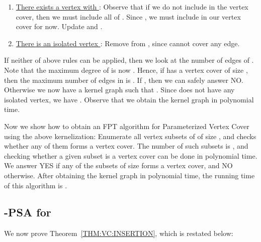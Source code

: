 \documentclass[11pt,letter]{article}
\begin{document}
\begin{enumerate}
 \item \underline{There exists a vertex  with }: Observe that if we do not include  in the vertex cover, then we must include all of . Since , we must include  in our vertex cover for now. Update  and .

\item \underline{There is an isolated vertex }: Remove  from , since
  cannot cover any edge.


\end{enumerate}

If neither of above rules can be applied, then we look at the number of edges of . Note that the maximum degree of  is now . Hence, if  has a vertex cover of size , then the maximum number of edges in  is . If , then we can safely answer NO. Otherwise we now have a kernel graph  such that . Since  does not have any isolated vertex, we have . Observe that we obtain the kernel graph  in polynomial time.


Now we show how to obtain an FPT algorithm for Parameterized Vertex Cover using the above kernelization: Enumerate all vertex subsets of
 of size , and checks whether any of them forms a vertex cover. The number of such subsets is ,
and checking whether a given subset is a vertex cover can be done in polynomial time.
We answer YES if any of the subsets of size  forms a vertex cover, and NO otherwise. After obtaining the kernel graph in polynomial time, the running time of this algorithm is .

\subsection{-PSA for }
\label{subsec:psa-vc}

We now prove Theorem~\ref{THM:VC:INSERTION}, which is restated below:
\end{document}
